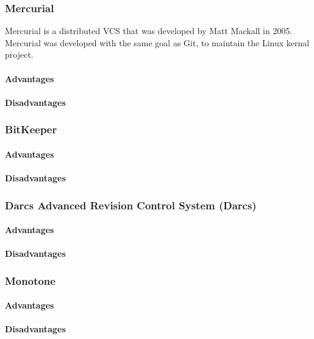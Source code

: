 \subsubsection{Mercurial}
Mercurial is a distributed VCS that was developed by Matt Mackall in 2005. Mercurial was developed with the same goal as Git, to maintain the Linux kernal project.
\paragraph{Advantages}
\paragraph{Disadvantages}
\subsubsection{BitKeeper}
\paragraph{Advantages}
\paragraph{Disadvantages}
\subsubsection{Darcs Advanced Revision Control System (Darcs)}
\paragraph{Advantages}
\paragraph{Disadvantages}
\subsubsection{Monotone}
\paragraph{Advantages}
\paragraph{Disadvantages}

